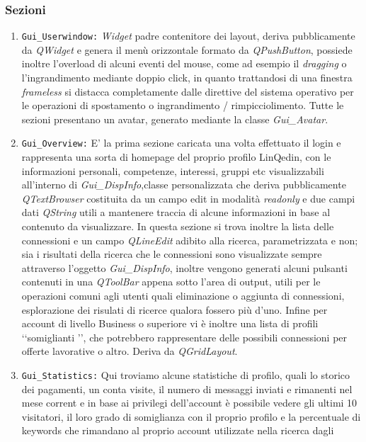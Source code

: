 \subsubsection*{Sezioni}
\begin{enumerate}
    \item
    \texttt{Gui\_Userwindow:} \textit{Widget} padre contenitore dei layout, deriva pubblicamente da \textit{QWidget} e genera il menù orizzontale
    formato da \textit{QPushButton}, possiede inoltre l'overload di alcuni eventi del mouse, come ad esempio il \textit{dragging} o l'ingrandimento
    mediante doppio click, in quanto trattandosi di una finestra \textit{frameless} si distacca completamente dalle direttive del sistema operativo
    per le operazioni di spostamento o ingrandimento / rimpicciolimento. Tutte le sezioni presentano un avatar, generato mediante la classe \textit{Gui\_Avatar}.
    \item
    \texttt{Gui\_Overview:} E' la prima sezione caricata una volta effettuato il login e rappresenta una sorta di homepage del proprio profilo LinQedin,
    con le informazioni personali, competenze, interessi, gruppi etc  visualizzabili all'interno di \textit{Gui\_DispInfo},classe personalizzata
    che deriva pubblicamente \textit{QTextBrowser} costituita da un campo edit in modalità \textit{readonly} e due campi dati \textit{QString} utili a
    mantenere traccia di alcune informazioni in base al contenuto da visualizzare.
    In questa sezione si trova inoltre la lista delle connessioni e un campo \textit{QLineEdit} adibito alla ricerca, parametrizzata e non; sia i risultati della ricerca
    che le connessioni sono visualizzate sempre attraverso l'oggetto \textit{Gui\_DispInfo}, inoltre vengono generati alcuni pulsanti contenuti in una \textit{QToolBar}
    appena sotto l'area di output, utili per le operazioni comuni agli utenti quali eliminazione o aggiunta di connessioni, esplorazione dei risulati di ricerce
    qualora fossero più d'uno. Infine per account di livello Business o superiore vi è inoltre una lista di profili \lq\lq somiglianti \rq\rq, che potrebbero rappresentare
    delle possibili connessioni per offerte lavorative o altro. Deriva da \textit{QGridLayout}.
    \item
    \texttt{Gui\_Statistics:} Qui troviamo alcune statistiche di profilo, quali lo storico dei pagamenti, un conta visite, il numero di messaggi inviati e rimanenti nel mese corrent e in base ai privilegi
    dell'account è possibile vedere gli ultimi 10 visitatori, il loro grado di somiglianza con il proprio profilo e la percentuale di keywords che rimandano al proprio account utilizzate nella ricerca dagli

\end{enumerate}
